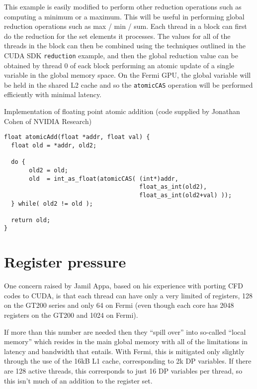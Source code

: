\documentclass[12pt]{article}
\begin{document}
This example is easily modified to perform other reduction 
operations such as computing a minimum or a maximum.  This 
will be useful in performing global reduction operations
such as max / min / sum.  Each thread in a block can first 
do the reduction for the set elements it processes.  The 
values for all of the threads in the block can then be 
combined using the techniques outlined in the CUDA SDK 
{\tt reduction} example, and then the global reduction 
value can be obtained by thread 0 of eack block performing
an atomic update of a single variable in the global memory 
space.  On the Fermi GPU, the global variable will be held 
in the shared L2 cache and so the {\tt atomicCAS} operation 
will be performed efficiently with minimal latency.

\begin{table}
\caption{Implementation of floating point atomic addition
        (code supplied by Jonathan Cohen of NVIDIA Research)}
\label{tab:atomic}
\begin{verbatim}
float atomicAdd(float *addr, float val) {
  float old = *addr, old2;

  do {
       old2 = old;
       old  = int_as_float(atomicCAS( (int*)addr,
                                      float_as_int(old2),
                                      float_as_int(old2+val) ));
  } while( old2 != old );

  return old;
}
\end{verbatim}
\end{table}

\newpage

\section{Register pressure}

One concern raised by Jamil Appa, based on his experience with 
porting CFD codes to CUDA, is that each thread can have only a very 
limited of registers, 128 on the GT200 series and only 64 on Fermi
(even though each core has 2048 registers on the GT200 and 1024 
on Fermi).

If more than this number are needed then they ``spill over'' into 
so-called ``local memory'' which resides in the main global memory 
with all of the limitations in latency and bandwidth that entails.
With Fermi, this is mitigated only slightly through the use of the 
16kB L1 cache, corresponding to 2k DP variables.  If there are 
128 active threads, this corresponds to just 16 DP variables per
thread, so this isn't much of an addition to the register set.
\end{document}
